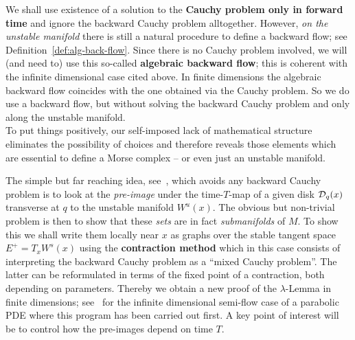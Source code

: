 \documentclass{article}
\begin{document}
\begin{convention}\label{con:back-flow}
We shall use existence of a solution to the
{\bf Cauchy problem only in forward time} and ignore the
backward Cauchy problem alltogether. However, \emph{on the unstable
manifold} there is still a natural procedure to define a backward flow;
see Definition~\ref{def:alg-back-flow}. Since there is no Cauchy problem involved,
we will (and need to) use this so-called {\bf algebraic backward
flow}; this is coherent with the infinite dimensional
case cited above. In finite dimensions the algebraic
backward flow coincides
with the one obtained via the Cauchy problem.
  So we do use a backward flow, but without solving the
  backward Cauchy problem and only along
  the unstable manifold.
\\
To put things positively, our self-imposed lack of mathematical
structure eliminates the possibility of choices and
therefore reveals those elements which are essential to define
a Morse complex -- or even just an unstable manifold.
\end{convention}

The simple but far reaching idea, see~\cite{weber:2014a,weber:2014c},
which avoids any backward Cauchy
problem is to look at the \emph{pre-image} under the time-$T$-map
of a given disk ${\mathcal{D}}_q(x)$ transverse at $q$ to the unstable manifold $W^u(x)$.
%
The obvious but non-trivial problem is then to show that these
\emph{sets} are in fact \emph{submanifolds} of $M$. To show this we shall
write them locally near $x$ as graphs over the stable tangent space
$E^+=T_x W^s(x)$ using the {\bf contraction method} which in
this case consists of interpreting the backward Cauchy problem as
a ``mixed Cauchy problem''. The latter can be reformulated in terms of
the fixed point of a contraction, both depending on parameters.
Thereby we obtain a new proof of the $\lambda$-Lemma in finite dimensions;
see~\cite{weber:2014a} for the infinite dimensional semi-flow case of a parabolic PDE
where this program has been carried out first.
A key point of interest will be to control how the pre-images depend on time $T$.


\end{document}
